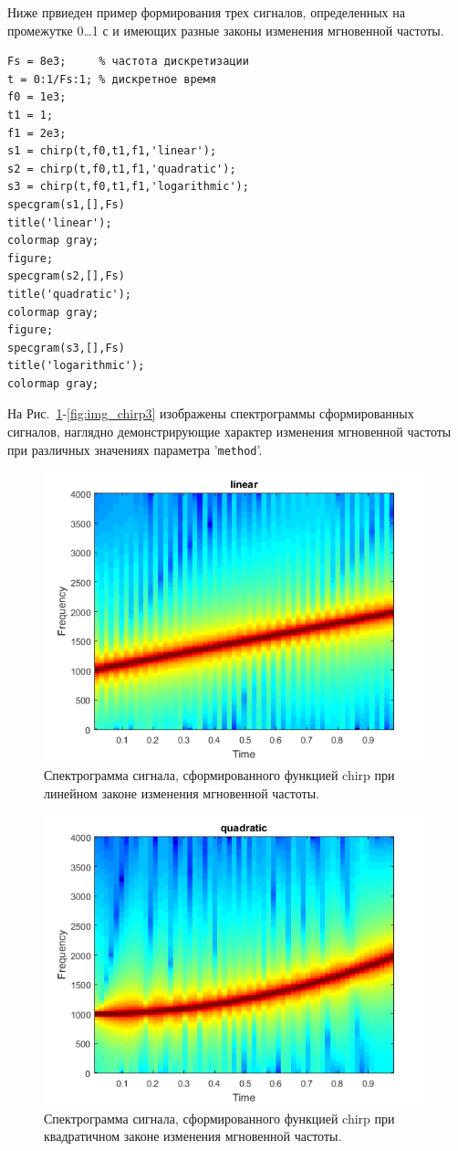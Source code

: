 \documentclass[12pt,a4paper]{article}
\begin{document}
Ниже првиеден пример формирования трех сигналов, определенных на промежутке 0\ldots{}1 с и имеющих разные законы изменения мгновенной частоты.
\begin{verbatim}
Fs = 8e3;     % частота дискретизации
t = 0:1/Fs:1; % дискретное время
f0 = 1e3;
t1 = 1;
f1 = 2e3;
s1 = chirp(t,f0,t1,f1,'linear');
s2 = chirp(t,f0,t1,f1,'quadratic');
s3 = chirp(t,f0,t1,f1,'logarithmic');
specgram(s1,[],Fs)
title('linear');
colormap gray;
figure;
specgram(s2,[],Fs)
title('quadratic');
colormap gray;
figure;
specgram(s3,[],Fs)
title('logarithmic');
colormap gray;
\end{verbatim}

На Рис.~\ref{fig:img_chirp1}-\ref{fig:img_chirp3} изображены спектрограммы сформированных сигналов, наглядно демонстрирующие характер изменения мгновенной частоты при различных значениях параметра '\verb|method|'.
\begin{figure}[H]
  \centering
  \includegraphics[scale=0.8]{img_chirp1}
  \caption{Спектрограмма сигнала, сформированного функцией chirp при линейном законе изменения мгновенной частоты.}
  \label{fig:img_chirp1}
\end{figure}
\begin{figure}[H]
  \centering
  \includegraphics[scale=0.8]{img_chirp2}
  \caption{Спектрограмма сигнала, сформированного функцией chirp при квадратичном законе изменения мгновенной частоты.}
  \label{fig:img_chirp2}
\end{figure}
\end{document}
